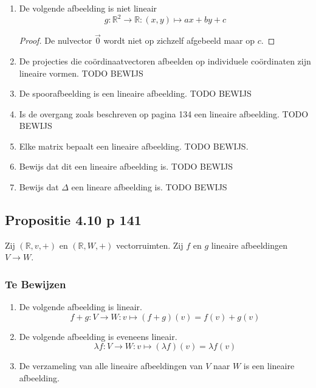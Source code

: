\documentclass[lineaire_algebra_oplossingen.tex]{subfiles}
\begin{document}
\begin{enumerate}
\begin{proof}
\[
f(\lambda_1v_1+\lambda_2v_2) = (a\lambda_1v_{1x}+b\lambda_1(v_{1y})+(a\lambda_2v_{2x}+b\lambda_2v_{2y})
\]
\[
= \lambda_1(av_{1x}+bv_{1y})+\lambda_2(av_{2x}+bv_{2y}) = \lambda_1f(v_1)+\lambda_2f(v_2))
\]
\end{proof}
\item De volgende afbeelding is niet lineair
\[g: \mathbb{R}^2 \rightarrow \mathbb{R}: (x,y) \mapsto ax+by+c\]
\begin{proof}
De nulvector $\vec{0}$ wordt niet op zichzelf afgebeeld maar op $c$.
\end{proof}
\item De projecties die co\"ordinaatvectoren afbeelden op individuele co\"ordinaten zijn lineaire vormen.
TODO BEWIJS
\item De spoorafbeelding is een lineaire afbeelding.
TODO BEWIJS
\item Is de overgang zoals beschreven op pagina 134 een lineaire afbeelding.
TODO BEWIJS
\item Elke matrix bepaalt een lineaire afbeelding.
TODO BEWIJS.
\item Bewijs dat dit een lineaire afbeelding is.
TODO BEWIJS
\item Bewijs dat $\Delta$ een lineare afbeelding is.
TODO BEWIJS
\end{enumerate}
\subsection{Propositie 4.10 p 141}
Zij $(\mathbb{R},v,+)$ en $(\mathbb{R},W,+)$ vectorruimten. Zij $f$ en $g$ lineaire afbeeldingen $V\rightarrow W$.
\subsubsection*{Te Bewijzen}
\begin{enumerate}
\item De volgende afbeelding is lineair.
\[f+g: V \rightarrow W: v\mapsto(f+g)(v)=f(v)+g(v)\]
\item De volgende afbeelding is eveneens lineair.
\[\lambda f: V\rightarrow W: v\mapsto (\lambda f)(v) = \lambda f(v)\]
\item De verzameling van alle lineaire afbeeldingen van $V$ naar $W$ is een lineaire afbeelding.
\end{enumerate}
\end{document}

